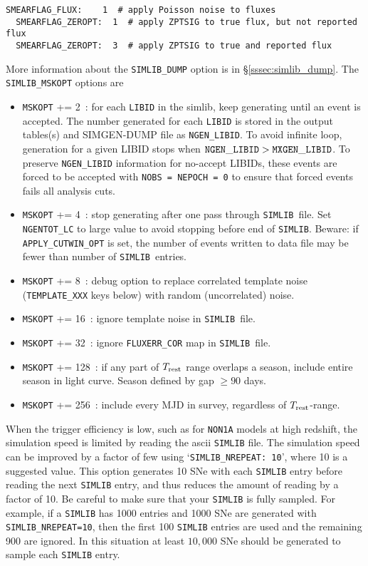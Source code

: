 \documentclass[12pt]{article}
\newcommand{\Trest}{T_{\rm rest}}
\newcommand{\simlib}{{\tt SIMLIB}}
\begin{document}
{\begin{Verbatim}[frame=single]
  SMEARFLAG_FLUX:    1  # apply Poisson noise to fluxes
  SMEARFLAG_ZEROPT:  1  # apply ZPTSIG to true flux, but not reported flux
  SMEARFLAG_ZEROPT:  3  # apply ZPTSIG to true and reported flux
\end{Verbatim}

More information about the {\tt SIMLIB\_DUMP} option
is in \S\ref{sssec:simlib_dump}.
The {\tt SIMLIB\_MSKOPT} options are 
\begin{itemize}
   \item {\tt MSKOPT} += 2~: for each {\tt LIBID} in the simlib,
      keep generating until an event is accepted. 
      The number generated for each {\tt LIBID} is stored in
      the output tables(s) and SIMGEN-DUMP file as {\tt NGEN\_LIBID}.
      To avoid infinite loop, generation for a given LIBID stops 
      when  ${\tt NGEN\_LIBID} > {\tt MXGEN\_LIBID}$. 
      To preserve {\tt NGEN\_LIBID} information for no-accept LIBIDs,
      these events are forced to be accepted with 
      {\tt NOBS = NEPOCH = 0} 
      to ensure that forced events fails all analysis cuts.
%
   \item {\tt MSKOPT} += 4~: 
        stop generating after one pass through \simlib\ file.
        Set {\tt NGENTOT\_LC} to large value to avoid stopping
        before end of \simlib. Beware: if {\tt APPLY\_CUTWIN\_OPT} is set,
        the number of events written to data file may be fewer
        than number of \simlib\ entries.
%
   \item {\tt MSKOPT} += 8~: debug option to replace correlated
      template noise ({\tt TEMPLATE\_XXX} keys below) with
      random (uncorrelated) noise.
%
   \item {\tt MSKOPT} += 16~: ignore template noise in \simlib\ file.
%
   \item {\tt MSKOPT} += 32~: ignore {\tt FLUXERR\_COR} map in \simlib\ file.
%
   \item {\tt MSKOPT} += 128~: if any part of $\Trest$ range overlaps
      a season, include entire season in light curve. Season defined
      by gap $\ge 90$ days.
%
   \item {\tt MSKOPT} += 256~: include every MJD in survey, 
      regardless of $\Trest$-range.
%
\end{itemize}

\medskip
When the trigger efficiency is low, such as for {\tt NON1A} models
at high redshift, the simulation speed is limited by reading the
ascii {\tt SIMLIB} file. The simulation speed can be improved by
a factor of few using  `{\tt SIMLIB\_NREPEAT: 10}', where 10
is a suggested value.
This option generates 10 SNe with each {\tt SIMLIB} entry before
reading the next {\tt SIMLIB} entry, and thus reduces the amount
of reading by a factor of 10. Be careful to make sure that your
{\tt SIMLIB} is fully sampled. For example, if a {\tt SIMLIB} has
1000 entries and 1000 SNe are generated with {\tt SIMLIB\_NREPEAT=10},
then the first 100 {\tt SIMLIB} entries are  used
and the remaining 900 are ignored. In this situation at least
$10,000$ SNe should be generated to sample each {\tt SIMLIB} entry.

}
\end{document}
